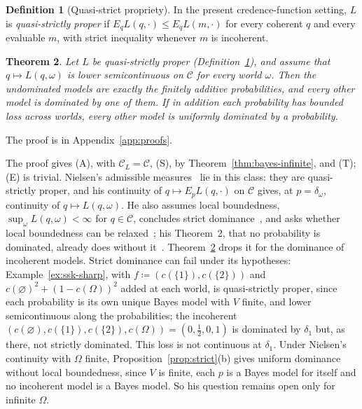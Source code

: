\documentclass[11pt]{article}
\newtheorem{theorem}{Theorem}[section]
\theoremstyle{definition}
\newtheorem{definition}[theorem]{Definition}
\theoremstyle{remark}
\newcommand{\C}{\mathcal C}
\begin{document}
\begin{definition}[Quasi-strict propriety]\label{def:quasi-propriety}
In the present credence-function setting, $L$ is \emph{quasi-strictly proper} if
$E_qL(q,\cdot)\le E_qL(m,\cdot)$ for every coherent $q$ and every evaluable $m$,
with strict inequality whenever $m$ is incoherent.
\end{definition}

\begin{theorem}\label{thm:nielsen}
Let $L$ be quasi-strictly proper (Definition~\ref{def:quasi-propriety}), and assume that $q\mapsto L(q,\omega)$ is lower semicontinuous on $\C$ for every world $\omega$. Then the undominated models are exactly the finitely additive probabilities, and every other model is dominated by one of them. If in addition each probability has bounded loss across worlds, every other model is uniformly dominated by a probability.
\end{theorem}
The proof is in Appendix~\ref{app:proofs}.

The proof gives (A), with $\C_L=\C$, (S), by Theorem~\ref{thm:bayes-infinite}, and (T); (E) is trivial. Nielsen's admissible measures~\cite{Nielsen} lie in this class: they are quasi-strictly proper, and his continuity of $q\mapsto E_pL(q,\cdot)$ on $\C$ gives, at $p=\delta_\omega$, continuity of $q\mapsto L(q,\omega)$. He also assumes local boundedness, $\sup_\omega L(q,\omega)<\infty$ for $q\in\C$, concludes strict dominance~\cite[Theorem~1]{Nielsen}, and asks whether local boundedness can be relaxed~\cite[\S4.2.1]{Nielsen}; his Theorem~2, that no probability is dominated, already does without it~\cite[note~27]{Nielsen}. Theorem~\ref{thm:nielsen} drops it for the dominance of incoherent models. Strict dominance can fail under its hypotheses: Example~\ref{ex:ssk-sharp}, with $f\coloneqq(c(\{1\}),c(\{2\}))$ and $c(\varnothing)^2+(1-c(\Omega))^2$ added at each world, is quasi-strictly proper, since each probability is its own unique Bayes model with $V$ finite, and lower semicontinuous along the probabilities; the incoherent $(c(\varnothing),c(\{1\}),c(\{2\}),c(\Omega))=(0,\frac12,0,1)$ is dominated by $\delta_1$ but, as there, not strictly dominated. This loss is not continuous at $\delta_1$. Under Nielsen's continuity with $\Omega$ finite, Proposition~\ref{prop:strict}(b) gives uniform dominance without local boundedness, since $V$ is finite, each $p$ is a Bayes model for itself and no incoherent model is a Bayes model. So his question remains open only for infinite $\Omega$.
\end{document}
